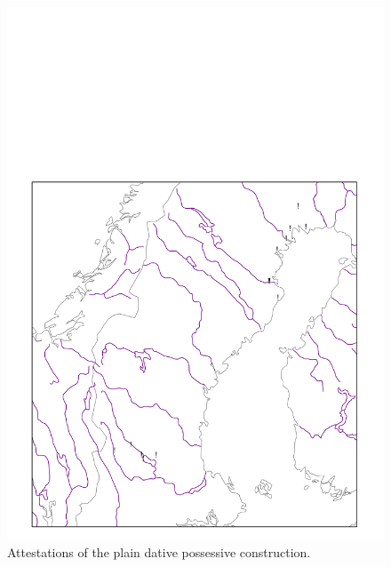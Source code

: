 \begin{figure}[h]
\includegraphics[height=.5\textheight]{figures/22_Attestationsoftheplain}
\caption{Attestations of the plain dative possessive construction.}
\label{map:18}

\end{figure}

